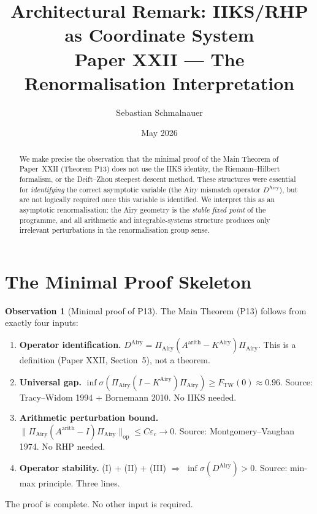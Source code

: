 \documentclass[12pt,a4paper]{amsart}
\title{Architectural Remark: IIKS/RHP as Coordinate System\\
{\normalsize Paper XXII --- The Renormalisation Interpretation}}
\author{Sebastian Schmalnauer}
\date{May 2026}
\theoremstyle{definition}
\newtheorem{observation}[theorem]{Observation}
\newcommand{\DAi}{D^{\mathrm{Airy}}}
\newcommand{\KAi}{K^{\mathrm{Airy}}}
\newcommand{\PAi}{\Pi_{\mathrm{Airy}}}
\newcommand{\Aarith}{A^{\mathrm{arith}}}
\newcommand{\norm}[1]{\|#1\|}
\begin{document}
\maketitle

\begin{abstract}
We make precise the observation that the minimal proof of the
Main Theorem of Paper~XXII (Theorem P13) does not use the
IIKS identity, the Riemann--Hilbert formalism, or the
Deift--Zhou steepest descent method.
These structures were essential for \emph{identifying} the correct
asymptotic variable (the Airy mismatch operator $\DAi$),
but are not logically required once this variable is identified.
We interpret this as an asymptotic renormalisation:
the Airy geometry is the \emph{stable fixed point} of the programme,
and all arithmetic and integrable-systems structure produces only
irrelevant perturbations in the renormalisation group sense.
\end{abstract}

\section{The Minimal Proof Skeleton}
\label{sec:skeleton}

\begin{observation}[Minimal proof of P13]\label{obs:minimal}
The Main Theorem (P13) follows from exactly four inputs:
\begin{enumerate}[\rm(I)]
  \item \textbf{Operator identification.}
    $\DAi = \PAi(\Aarith - \KAi)\PAi$.
    This is a definition (Paper XXII, Section~5), not a theorem.
  \item \textbf{Universal gap.}
    $\inf\sigma(\PAi(I - \KAi)\PAi) \ge F_{\mathrm{TW}}(0) \approx 0.96$.
    Source: Tracy--Widom 1994 + Bornemann 2010. No IIKS needed.
  \item \textbf{Arithmetic perturbation bound.}
    $\norm{\PAi(\Aarith - I)\PAi}_{\mathrm{op}} \le C\varepsilon_c \to 0$.
    Source: Montgomery--Vaughan 1974. No RHP needed.
  \item \textbf{Operator stability.}
    (I) + (II) + (III) $\Rightarrow$ $\inf\sigma(\DAi) > 0$.
    Source: min-max principle. Three lines.
\end{enumerate}
The proof is complete. No other input is required.
\end{observation}
\end{document}
